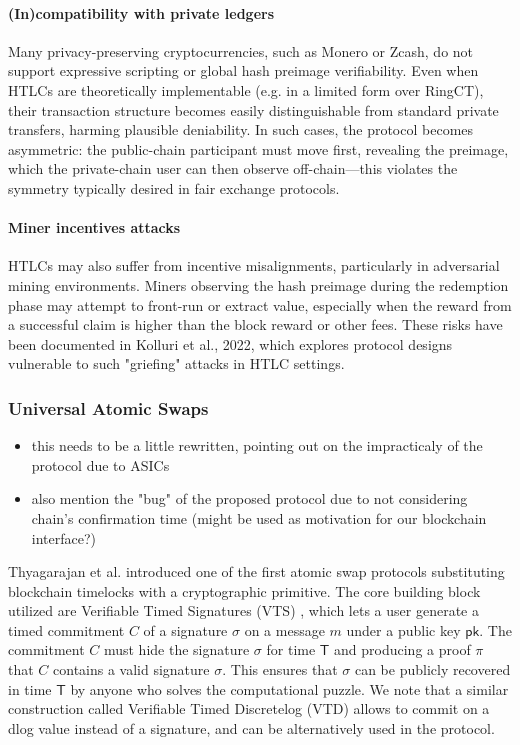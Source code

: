 \paragraph*{(In)compatibility with private ledgers}
Many privacy-preserving cryptocurrencies, such as Monero or Zcash, do not support expressive scripting or global hash preimage verifiability. Even when HTLCs are theoretically implementable (e.g. in a limited form over RingCT), their transaction structure becomes easily distinguishable from standard private transfers, harming plausible deniability. In such cases, the protocol becomes asymmetric: the public-chain participant must move first, revealing the preimage, which the private-chain user can then observe off-chain—this violates the symmetry typically desired in fair exchange protocols.
\paragraph*{Miner incentives attacks} HTLCs may also suffer from incentive misalignments, particularly in adversarial mining environments. Miners observing the hash preimage during the redemption phase may attempt to front-run or extract value, especially when the reward from a successful claim is higher than the block reward or other fees. These risks have been documented in Kolluri et al., 2022, which explores protocol designs vulnerable to such "griefing" attacks in HTLC settings.

\subsubsection{Universal Atomic Swaps}
\begin{itemize}
\item this needs to be a little rewritten, pointing out on the impracticaly of the protocol due to ASICs
\item also mention the "bug" of the proposed protocol due to not considering chain's confirmation time (might be used as motivation for our blockchain interface?)
\end{itemize}

Thyagarajan et al. \cite{uas} introduced one of the first atomic swap protocols substituting blockchain timelocks with a cryptographic primitive. 
The core building block utilized are Verifiable Timed Signatures (VTS) \cite{vts}, which lets a user generate a timed commitment $C$ of a signature $\sigma$ on a message $m$ under a public key $\mathsf{pk}$. The commitment $C $ must hide the signature $\sigma$ for time $\mathsf{T}$ and producing a proof $\pi$ that $C$ contains a valid signature $\sigma$. This ensures that $\sigma$ can be publicly recovered in time $\mathsf{T}$ by anyone who solves the computational puzzle. We note that a similar construction called Verifiable Timed Discretelog (VTD) allows to commit on a dlog value instead of a signature, and can be alternatively used in the protocol.

